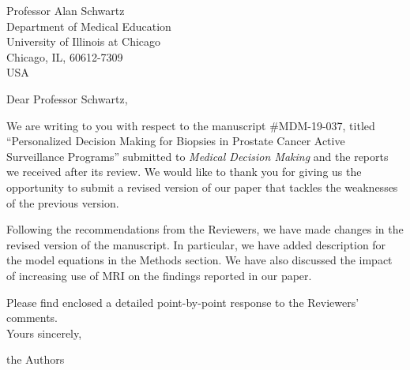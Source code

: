 \documentclass[a4paper, 11pt]{letter}
\begin{document}
\begin{letter}{Professor Alan Schwartz\\
Department of Medical Education\\
University of Illinois at Chicago\\
Chicago, IL, 60612-7309\\
USA}

\address{Department of Biostatistics\\
Erasmus University Medical Center\\PO Box 2040, 3000 CA Rotterdam\\ the Netherlands
}

\opening{Dear Professor Schwartz,}

We are writing to you with respect to the manuscript \#MDM-19-037, titled ``Personalized Decision Making for Biopsies in Prostate Cancer Active Surveillance Programs'' submitted to \emph{Medical Decision Making} and the reports we received after its review. We would like to thank you for giving us the opportunity to submit a revised version of our paper that tackles the weaknesses of the previous version.

Following the recommendations from the Reviewers, we have made changes in the revised version of the manuscript. In particular, we have added description for the model equations in the Methods section. We have also discussed the impact of increasing use of MRI on the findings reported in our paper.

Please find enclosed a detailed point-by-point response to the Reviewers' comments.\\

Yours sincerely,

the Authors



\end{letter}
\end{document}
